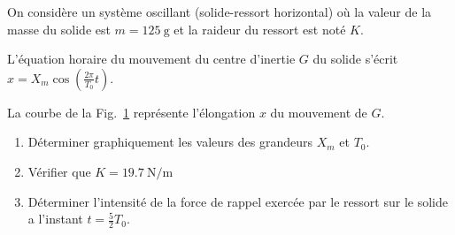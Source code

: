On considère un système oscillant (solide-ressort horizontal) où la valeur de la
masse du solide est $m=\qty{125}{\gram}$ et la raideur du ressort est noté $K$.

\begin{minipage}{0.65\linewidth}
    L'équation horaire du mouvement du centre d'inertie $G$ du solide s'écrit
    $x=X_m \cos \left(\frac{2\pi}{T_0} t\right)$.

    La courbe de la Fig.~\ref{fig:2bac_svt_national_2024_normale_phys_ex3_2}
    représente l'élongation $x$ du mouvement de $G$.

    \begin{enumerate}
        \item Déterminer graphiquement les valeurs des grandeurs $X_m$ et
              $T_0$.
        \item Vérifier que $K=\qty{19.7}{\newton\per\meter}$
        \item Déterminer l'intensité de la force de rappel exercée par le
              ressort sur le solide a l'instant $t=\frac{5}{2} T_0$.
    \end{enumerate}
\end{minipage}
\hfill
\begin{minipage}{0.34\linewidth}
\begin{figure}[H]
    \centering
    \caption{}
    \label{fig:2bac_svt_national_2024_normale_phys_ex3_2}
\end{figure}
\end{minipage}


